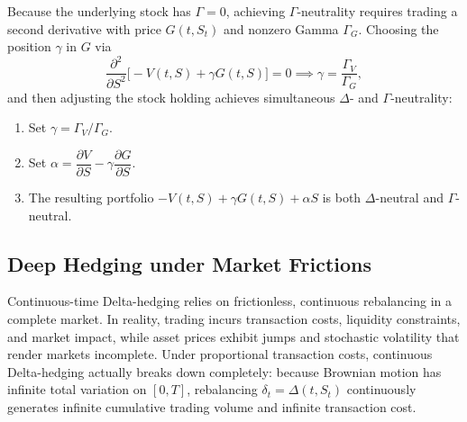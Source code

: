 Because the underlying stock has $\Gamma = 0$, achieving $\Gamma$-neutrality requires trading a second derivative with price $G(t, S_t)$ and nonzero Gamma $\Gamma_G$. Choosing the position $\gamma$ in $G$ via
\[
    \frac{\partial^2}{\partial S^2}\bigl[-V(t, S) + \gamma G(t, S)\bigr] = 0
    \implies \gamma = \frac{\Gamma_V}{\Gamma_G},
\]
and then adjusting the stock holding achieves simultaneous $\Delta$- and $\Gamma$-neutrality:
\begin{enumerate}
    \item Set $\gamma = \Gamma_V / \Gamma_G$.
    \item Set $\alpha = \dfrac{\partial V}{\partial S} - \gamma \dfrac{\partial G}{\partial S}$.
    \item The resulting portfolio $-V(t, S) + \gamma G(t, S) + \alpha S$ is both $\Delta$-neutral and $\Gamma$-neutral.
\end{enumerate}

\subsection{Deep Hedging under Market Frictions}
\label{sec:ch04-deep-hedging}
Continuous-time Delta-hedging relies on frictionless, continuous rebalancing in a complete market. In reality, trading incurs transaction costs, liquidity constraints, and market impact, while asset prices exhibit jumps and stochastic volatility that render markets incomplete. Under proportional transaction costs, continuous Delta-hedging actually breaks down completely: because Brownian motion has infinite total variation on $[0, T]$, rebalancing $\delta_t = \Delta(t, S_t)$ continuously generates infinite cumulative trading volume and infinite transaction cost.

